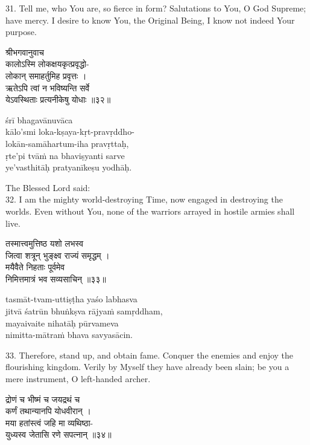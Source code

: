 31. Tell me, who You are, so fierce in form? Salutations to You, O God Supreme;
have mercy. I desire to know You, the Original Being, I know not indeed Your
purpose.

\begin{gitaverse}
श्रीभगवानुवाच \\
कालोऽस्मि लोकक्षयकृत्प्रवृद्धो- \\
\tab लोकान् समाहर्तुमिह प्रवृत्तः । \\
ऋतेऽपि त्वां न भविष्यन्ति सर्वे \\
\tab येऽवस्थिताः प्रत्यनीकेषु योधाः ॥३२॥
\end{gitaverse}

\begin{transliteration}
śrī bhagavānuvāca \\
kālo'smi loka-kṣaya-kṛt-pravṛddho- \\
\tab lokān-samāhartum-iha pravṛttaḥ, \\
ṛte'pi tvāṁ na bhaviṣyanti sarve \\
\tab ye'vasthitāḥ pratyanīkeṣu yodhāḥ.
\end{transliteration}

The Blessed Lord said: \\
32. I am the mighty world-destroying Time, now engaged in destroying the
worlds. Even without You, none of the warriors arrayed in hostile armies shall
live.

\begin{gitaverse}
तस्मात्त्वमुत्तिष्ठ यशो लभस्व \\
\tab जित्वा शत्रून् भुङ्क्ष्व राज्यं समृद्धम् । \\
मयैवैते निहताः पूर्वमेव \\
\tab निमित्तमात्रं भव सव्यसाचिन् ॥३३॥
\end{gitaverse}

\begin{transliteration}
tasmāt-tvam-uttiṣṭha yaśo labhasva \\
\tab jitvā śatrūn bhuṅkṣva rājyaṁ samṛddham, \\
mayaivaite nihatāḥ pūrvameva \\
\tab nimitta-mātraṁ bhava savyasācin.
\end{transliteration}

33. Therefore, stand up, and obtain fame. Conquer the enemies and enjoy the
flourishing kingdom. Verily by Myself they have already been slain; be you a
mere instrument, O left-handed archer.

\begin{gitaverse}
द्रोणं च भीष्मं च जयद्रथं च \\
\tab कर्णं तथान्यानपि योधवीरान् । \\
मया हतांस्त्वं जहि मा व्यथिष्ठा- \\
\tab युध्यस्व जेतासि रणे सपत्नान् ॥३४॥
\end{gitaverse}

